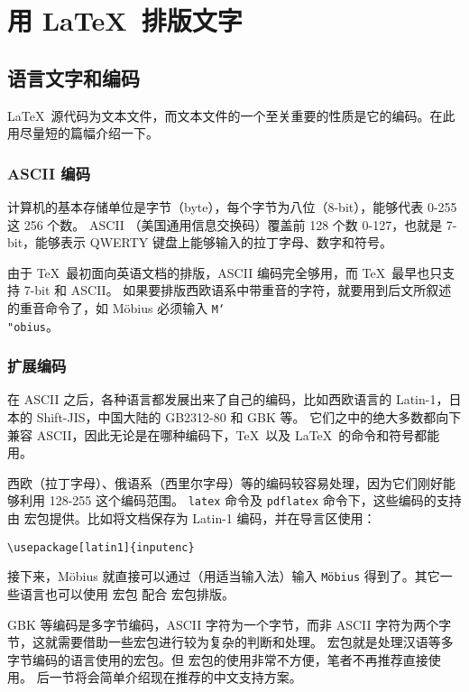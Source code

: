 \chapter{用 \LaTeX\ 排版文字}

\section{语言文字和编码}\label{sec:encoding}

\LaTeX\ 源代码为文本文件，而文本文件的一个至关重要的性质是它的编码。在此用尽量短的篇幅介绍一下。

\subsection{ASCII 编码}\label{subsec:ascii}

计算机的基本存储单位是字节（byte），每个字节为八位（8-bit），能够代表 0-255 这 256 个数。
ASCII （美国通用信息交换码）覆盖前 128 个数 0-127，也就是 7-bit，能够表示 QWERTY 键盘上能够输入的拉丁字母、数字和符号。

由于 \TeX\ 最初面向英语文档的排版，ASCII 编码完全够用，而 \TeX\ 最早也只支持 7-bit 和 ASCII。
如果要排版西欧语系中带重音的字符，就要用到后文所叙述的重音命令了，如 M\"obius 必须输入 \texttt{M\char`\\"obius}。

\subsection{扩展编码}\label{subsec:ext-encoding}

在 ASCII 之后，各种语言都发展出来了自己的编码，比如西欧语言的 Latin-1，日本的 Shift-JIS，中国大陆的 GB2312-80 和 GBK 等。
它们之中的绝大多数都向下兼容 ASCII，因此无论是在哪种编码下，\TeX\ 以及 \LaTeX\ 的命令和符号都能用。

西欧（拉丁字母）、俄语系（西里尔字母）等的编码较容易处理，因为它们刚好能够利用 128-255 这个编码范围。
\texttt{latex} 命令及 \texttt{pdflatex} 命令下，这些编码的支持由  宏包提供。比如将文档保存为 Latin-1 编码，并在导言区使用：
\begin{verbatim}
\usepackage[latin1]{inputenc}
\end{verbatim}

接下来，M\"obius 就直接可以通过（用适当输入法）输入 \texttt{M\"obius} 得到了。其它一些语言也可以使用  宏包
配合  宏包排版。

GBK 等编码是多字节编码，ASCII 字符为一个字节，而非 ASCII 字符为两个字节，这就需要借助一些宏包进行较为复杂的判断和处理。
 宏包就是处理汉语等多字节编码的语言使用的宏包。但  宏包的使用非常不方便，笔者不再推荐直接使用。
后一节将会简单介绍现在推荐的中文支持方案。

